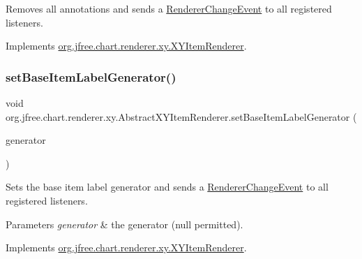 Removes all annotations and sends a \mbox{\hyperlink{}{Renderer\+Change\+Event}} to all registered listeners. 

Implements \mbox{\hyperlink{interfaceorg_1_1jfree_1_1chart_1_1renderer_1_1xy_1_1_x_y_item_renderer_a7144ca499540dcd5bc199cb2de85cc74}{org.\+jfree.\+chart.\+renderer.\+xy.\+X\+Y\+Item\+Renderer}}.

\mbox{\label{classorg_1_1jfree_1_1chart_1_1renderer_1_1xy_1_1_abstract_x_y_item_renderer_a579128c27e51f1fa12ed95798abfa222}} 
\subsubsection{\texorpdfstring{set\+Base\+Item\+Label\+Generator()}{setBaseItemLabelGenerator()}}
{\footnotesize\ttfamily void org.\+jfree.\+chart.\+renderer.\+xy.\+Abstract\+X\+Y\+Item\+Renderer.\+set\+Base\+Item\+Label\+Generator (\begin{DoxyParamCaption}\item[{\mbox{\hyperlink{interfaceorg_1_1jfree_1_1chart_1_1labels_1_1_x_y_item_label_generator}{X\+Y\+Item\+Label\+Generator}}}]{generator }\end{DoxyParamCaption})}

Sets the base item label generator and sends a \mbox{\hyperlink{}{Renderer\+Change\+Event}} to all registered listeners.


\begin{DoxyParams}{Parameters}
{\em generator} & the generator ({\ttfamily null} permitted). \\
\hline
\end{DoxyParams}


Implements \mbox{\hyperlink{interfaceorg_1_1jfree_1_1chart_1_1renderer_1_1xy_1_1_x_y_item_renderer_adb2a89010f4e58e1b4efc1a0e4c1df22}{org.\+jfree.\+chart.\+renderer.\+xy.\+X\+Y\+Item\+Renderer}}.

\mbox{\label{classorg_1_1jfree_1_1chart_1_1renderer_1_1xy_1_1_abstract_x_y_item_renderer_aff6e3670d0799d590158695fe311a337}} 
